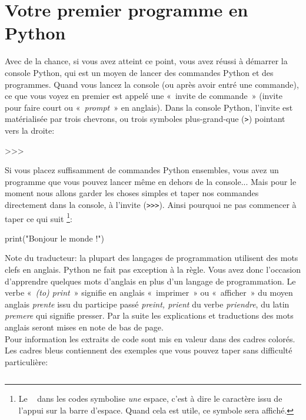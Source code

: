 \section{Votre premier programme en Python}

Avec de la chance, si vous avez atteint ce point, vous avez réussi à démarrer la console Python, qui est un moyen de lancer des commandes Python et des programmes. Quand vous lancez la console (ou après avoir entré une commande), ce que vous voyez en premier est appelé une « invite de commande » (invite pour faire court ou « \emph{prompt} » en anglais). 
Dans la console Python, l'invite est matérialisée par trois chevrons, ou trois symboles plus-grand-que (\verb+>+) pointant vers la droite:
\begin{Verbatim*}[frame=single,rulecolor=\color{gray}, label=ne pas saisir]
>>>
\end{Verbatim*}
Si vous placez suffisamment de commandes Python ensembles, vous avez un programme que vous pouvez lancer même en dehors de la console... Mais pour le moment nous allons garder les choses simples et taper nos commandes directement dans la console, à l'invite (\verb+>>>+).
\VerbatimFootnotes
Ainsi pourquoi ne pas commencer à taper ce qui suit
\footnote{Le \verb*+ + dans les codes symbolise \emph{une} espace, c'est à dire le caractère issu de l'appui sur la barre d'espace. Quand cela est utile, ce symbole sera affiché.}:

\begin{Verbatim*}[frame=single,rulecolor=\color{mbleu}, label=à taper]
print("Bonjour le monde !")
\end{Verbatim*}

Note du traducteur: la plupart des langages de programmation utilisent des mots clefs en anglais. Python ne fait pas exception à la règle. Vous avez donc l'occasion d'apprendre quelques mots d'anglais en plus d'un langage de programmation. Le verbe « \emph{(to) print} » signifie en anglais « imprimer » ou « afficher » du moyen anglais \emph{prente} issu du participe passé \emph{preint, prient} du verbe \emph{priendre}, du latin \emph{premere} qui signifie presser. Par la suite les explications et traductions des mots anglais seront mises en note de bas de page.\\

Pour information les extraits de code sont mis en valeur dans des cadres colorés. 
Les cadres bleus contiennent des exemples que vous pouvez taper sans difficulté particulière:

\begin{Verbatim}[frame=single,rulecolor=\color{mbleu}, label=à taper]

\end{Verbatim}

